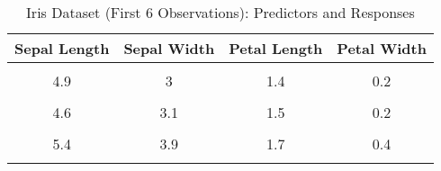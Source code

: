 \documentclass{article}
\begin{document}
\pagestyle{empty}

\begin{table}[H]
\centering
\caption{\label{tab:iris-dataset}Iris Dataset (First 6 Observations): Predictors and Responses}
\centering
\fontsize{10}{12}\selectfont
\begin{tabular}[t]{cccc}
\toprule
Sepal Length & Sepal Width & Petal Length & Petal Width\\
\midrule
\cellcolor{gray!10}{5.1} & \cellcolor{gray!10}{3.5} & \cellcolor{gray!10}{1.4} & \cellcolor{gray!10}{0.2}\\
4.9 & 3 & 1.4 & 0.2\\
\cellcolor{gray!10}{4.7} & \cellcolor{gray!10}{3.2} & \cellcolor{gray!10}{1.3} & \cellcolor{gray!10}{0.2}\\
4.6 & 3.1 & 1.5 & 0.2\\
\cellcolor{gray!10}{5} & \cellcolor{gray!10}{3.6} & \cellcolor{gray!10}{1.4} & \cellcolor{gray!10}{0.2}\\
5.4 & 3.9 & 1.7 & 0.4\\
\cellcolor{gray!10}{\vdots} & \cellcolor{gray!10}{\vdots} & \cellcolor{gray!10}{\vdots} & \cellcolor{gray!10}{\vdots}\\
\bottomrule
\end{tabular}
\end{table}
\end{document}
